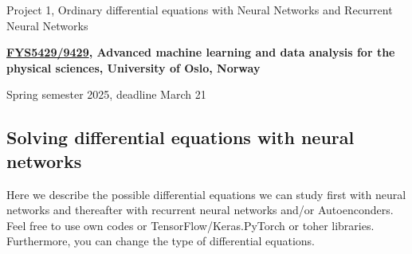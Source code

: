\documentclass[%
oneside,                 %
final,                   %
10pt]{article}
\begin{document}

\newcommand{\exercisesection}[1]{\subsection*{#1}}






\thispagestyle{empty}

\begin{center}
{\LARGE\bf
\begin{spacing}{1.25}
Project 1, Ordinary differential equations with Neural Networks and Recurrent Neural Networks
\end{spacing}
}
\end{center}


\begin{center}
{\bf \href{{https://www.uio.no/studier/emner/matnat/fys/FYS5429/index-eng.html}}{FYS5429/9429}, Advanced machine learning and data analysis for the physical sciences, University of Oslo, Norway${}^{}$} \\ [0mm]
\end{center}

\begin{center}
\end{center}
    

\begin{center}
Spring semester 2025, deadline March 21
\end{center}

\vspace{1cm}


\subsection*{Solving  differential equations with neural networks}

Here we describe the possible differential equations we can study
first with neural networks and thereafter with recurrent neural
networks and/or Autoenconders.  Feel free to use own codes or TensorFlow/Keras.PyTorch or toher libraries.
Furthermore, you can change the type of differential equations.
\end{document}
